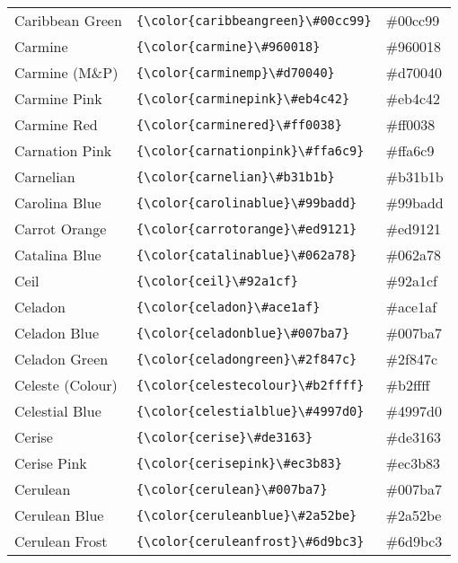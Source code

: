 \documentclass[9.5pt]{article}
\begin{document}
\begin{longtable}{l | l | l}
	Caribbean Green & \verb!{\color{caribbeangreen}\#00cc99}! & {\color{caribbeangreen}\#00cc99}\\
	Carmine & \verb!{\color{carmine}\#960018}! & {\color{carmine}\#960018}\\
	Carmine (M\&P) & \verb!{\color{carminemp}\#d70040}! & {\color{carminemp}\#d70040}\\
	Carmine Pink & \verb!{\color{carminepink}\#eb4c42}! & {\color{carminepink}\#eb4c42}\\
	Carmine Red & \verb!{\color{carminered}\#ff0038}! & {\color{carminered}\#ff0038}\\
	Carnation Pink & \verb!{\color{carnationpink}\#ffa6c9}! & {\color{carnationpink}\#ffa6c9}\\
	Carnelian & \verb!{\color{carnelian}\#b31b1b}! & {\color{carnelian}\#b31b1b}\\
	Carolina Blue & \verb!{\color{carolinablue}\#99badd}! & {\color{carolinablue}\#99badd}\\
	Carrot Orange & \verb!{\color{carrotorange}\#ed9121}! & {\color{carrotorange}\#ed9121}\\
	Catalina Blue & \verb!{\color{catalinablue}\#062a78}! & {\color{catalinablue}\#062a78}\\
	Ceil & \verb!{\color{ceil}\#92a1cf}! & {\color{ceil}\#92a1cf}\\
	Celadon & \verb!{\color{celadon}\#ace1af}! & {\color{celadon}\#ace1af}\\
	Celadon Blue & \verb!{\color{celadonblue}\#007ba7}! & {\color{celadonblue}\#007ba7}\\
	Celadon Green & \verb!{\color{celadongreen}\#2f847c}! & {\color{celadongreen}\#2f847c}\\
	Celeste (Colour) & \verb!{\color{celestecolour}\#b2ffff}! & {\color{celestecolour}\#b2ffff}\\
	Celestial Blue & \verb!{\color{celestialblue}\#4997d0}! & {\color{celestialblue}\#4997d0}\\
	Cerise & \verb!{\color{cerise}\#de3163}! & {\color{cerise}\#de3163}\\
	Cerise Pink & \verb!{\color{cerisepink}\#ec3b83}! & {\color{cerisepink}\#ec3b83}\\
	Cerulean & \verb!{\color{cerulean}\#007ba7}! & {\color{cerulean}\#007ba7}\\
	Cerulean Blue & \verb!{\color{ceruleanblue}\#2a52be}! & {\color{ceruleanblue}\#2a52be}\\
	Cerulean Frost & \verb!{\color{ceruleanfrost}\#6d9bc3}! & {\color{ceruleanfrost}\#6d9bc3}\\

\end{longtable}
\end{document}
